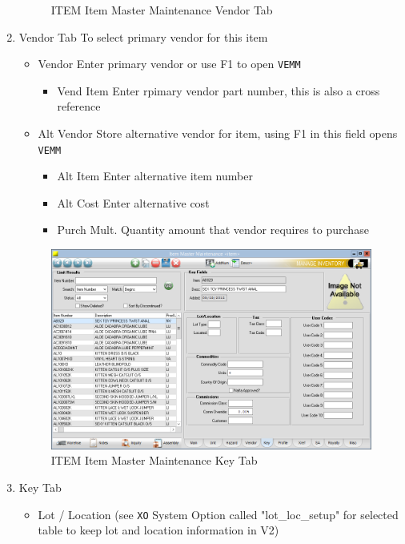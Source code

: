 \begin{enumerate}
\begin{figure}[H]
		\caption{ITEM Item Master Maintenance Vendor Tab}
	\end{figure}
	\item Vendor Tab \textemdash To select primary vendor for this item
	\begin{itemize}
		\item Vendor \textemdash Enter primary vendor or use F1 to open \texttt{VEMM}
		\begin{itemize}
			\item Vend Item \textemdash Enter rpimary vendor part number, this is also a cross reference
		\end{itemize}
		\item Alt Vendor \textemdash Store alternative vendor for item, using F1 in this field opens \texttt{VEMM}
		\begin{itemize}
			\item Alt Item \textemdash Enter alternative item number
			\item Alt Cost \textemdash Enter alternative cost
			\item Purch Mult. \textemdash Quantity amount that vendor requires to purchase
		\end{itemize}
	\end{itemize}
	\begin{figure}[H]
		\includegraphics[width=\textwidth]{../img/image59}
		\caption{ITEM Item Master Maintenance Key Tab}
	\end{figure}
	\item Key Tab
	\begin{itemize}
		\item Lot / Location (see \texttt{XO} System Option called "lot\_loc\_setup" for selected table to keep lot and location information in V2)
		\begin{itemize}

\end{itemize}
\end{itemize}
\end{enumerate}

